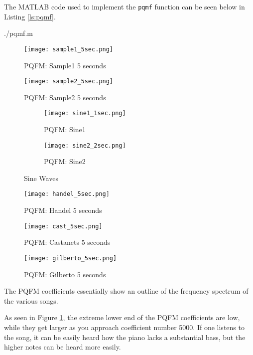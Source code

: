 \documentclass{article} %
\begin{document}
The MATLAB code used to implement the \verb|pqmf| function can be seen below
in Listing \ref{ls:pqmf}.  


{./pqmf.m} 


\begin{figure}[H]
\centering
\texttt{[image: sample1\_5sec.png]}
\caption{PQFM: Sample1 5 seconds}
\label{fig:samp1PQFM}
\end{figure}
\begin{figure}[H]
\centering
\texttt{[image: sample2\_5sec.png]}
\caption{PQFM: Sample2 5 seconds}
\label{fig:samp2PQFM}
\end{figure}


\begin{figure}[H]

\begin{subfigure}{0.5\textwidth}
\centering
\texttt{[image: sine1\_1sec.png]}
\caption{PQFM: Sine1}
\label{fig:sin1PQFM}
\end{subfigure}
\begin{subfigure}{0.5\textwidth}
\centering
\texttt{[image: sine2\_2sec.png]}
\caption{PQFM: Sine2}
\label{fig:sin2PQFM}
\end{subfigure}
\caption{Sine Waves}
\end{figure}


\begin{figure}[H]
\centering
\texttt{[image: handel\_5sec.png]}
\caption{PQFM: Handel 5 seconds}
\label{fig:handPQFM}
\end{figure}

\begin{figure}[H]
\centering
\texttt{[image: cast\_5sec.png]}
\caption{PQFM: Castanets 5 seconds}
\label{fig:castPQFM}
\end{figure}


\begin{figure}[H]
\centering
\texttt{[image: gilberto\_5sec.png]}
\caption{PQFM: Gilberto 5 seconds}
\label{fig:gilbPQFM}
\end{figure}




The PQFM coefficients essentially show an outline of the frequency
spectrum of the various songs. 

As seen in Figure \ref{fig:samp1PQFM}, the extreme lower end of the PQFM
coefficients are low, while they get larger as you approach coefficient
number 5000. If one listens to the song, it can be easily heard how the
piano lacks a substantial bass, but the higher notes can be heard more
easily. 
\end{document}
